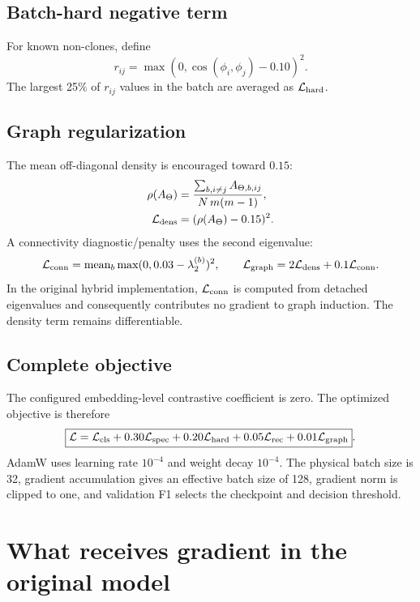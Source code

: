 \documentclass[11pt,a4paper]{article}
\newcommand{\mean}{\operatorname{mean}}
\begin{document}
\subsection{Batch-hard negative term}

For known non-clones, define
\begin{equation}
r_{ij}=\max\!\left(0,\cos(\phi_i,\phi_j)-0.10\right)^2.
\end{equation}
The largest 25\% of $r_{ij}$ values in the batch are averaged as
$\mathcal L_{\rm hard}$.

\subsection{Graph regularization}

The mean off-diagonal density is encouraged toward $0.15$:
\begin{align}
\rho(A_\Theta)
&=\frac{\sum_{b,i\ne j}A_{\Theta,b,ij}}
{N\,m(m-1)},\\
\mathcal L_{\rm dens}&=(\rho(A_\Theta)-0.15)^2.
\end{align}
A connectivity diagnostic/penalty uses the second eigenvalue:
\begin{equation}
\mathcal L_{\rm conn}
=\mean_b\max(0,0.03-\lambda_2^{(b)})^2,
\qquad
\mathcal L_{\rm graph}
=2\mathcal L_{\rm dens}+0.1\mathcal L_{\rm conn}.
\end{equation}
In the original hybrid implementation, $\mathcal L_{\rm conn}$ is computed from
detached eigenvalues and consequently contributes no gradient to graph induction.
The density term remains differentiable.

\subsection{Complete objective}

The configured embedding-level contrastive coefficient is zero. The optimized
objective is therefore
\begin{equation}
\boxed{
\mathcal L
=\mathcal L_{\rm cls}
+0.30\mathcal L_{\rm spec}
+0.20\mathcal L_{\rm hard}
+0.05\mathcal L_{\rm rec}
+0.01\mathcal L_{\rm graph}
}.
\end{equation}
AdamW uses learning rate $10^{-4}$ and weight decay $10^{-4}$. The physical
batch size is 32, gradient accumulation gives an effective batch size of 128,
gradient norm is clipped to one, and validation F1 selects the checkpoint and
decision threshold.

\section{What receives gradient in the original model}
\end{document}
